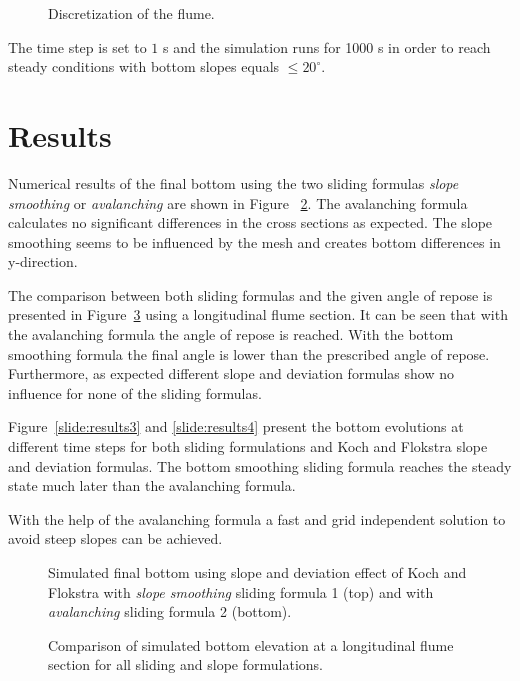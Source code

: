\begin{figure} [!h]
\centering
{}
 \caption{Discretization of the flume.}\label{slide:mesh}
\end{figure}

The time step is set to $1$ s and the simulation runs for 1000 s in order to
reach steady conditions with bottom slopes equals $\leq 20^\circ$.


\section{Results}
%
Numerical results of the final bottom using the two sliding formulas
\textit{slope smoothing} or \textit{avalanching} are shown in Figure
~\ref{slide:results1}. The avalanching formula calculates no significant
differences in the cross sections as expected. The slope smoothing seems to be
influenced by the mesh and creates bottom differences in y-direction.

The comparison between both sliding formulas and the given angle of repose is
presented in Figure~\ref{slide:results2} using a longitudinal flume section.
It can be
seen that with the avalanching formula the angle of repose is reached. With the
bottom smoothing formula the final angle is lower than the prescribed angle of
repose.
Furthermore, as expected different slope and deviation formulas show no
influence for none of the sliding formulas.

Figure~\ref{slide:results3} and \ref{slide:results4} present the bottom
evolutions at different time steps for both sliding formulations and Koch and
Flokstra slope and deviation formulas. The bottom smoothing sliding formula
reaches the
steady state much later than the avalanching formula.

With the help of the avalanching formula a fast and grid independent solution
to avoid steep slopes can be achieved.

\begin{figure} [!h]
  \centering
{}
\caption{Simulated final bottom using slope and deviation effect of Koch and
Flokstra with \textit{slope smoothing} sliding formula 1 (top) and with
\textit{avalanching} sliding formula 2 (bottom).}
\label{slide:results1}
\end{figure}

\begin{figure} [!h]
\centering
{}
 \caption{Comparison of simulated bottom elevation at a longitudinal flume
section for all sliding and slope formulations.}\label{slide:results2}
\end{figure}

